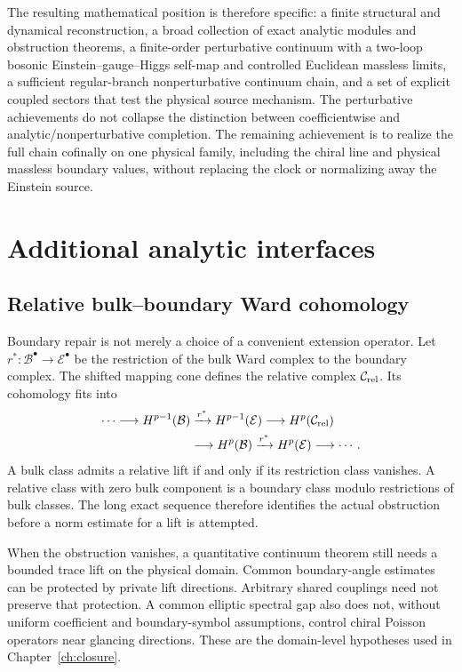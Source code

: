 \documentclass[11pt,a4paper,oneside]{book}
\theoremstyle{plain}
\theoremstyle{definition}
\theoremstyle{remark}
\newcommand{\src}[2]{\cite{#1}}
\begin{document}
The resulting mathematical position is therefore specific: a finite structural and dynamical reconstruction, a broad collection of exact analytic modules and obstruction theorems, a finite-order perturbative continuum with a two-loop bosonic Einstein--gauge--Higgs self-map and controlled Euclidean massless limits, a sufficient regular-branch nonperturbative continuum chain, and a set of explicit coupled sectors that test the physical source mechanism.  The perturbative achievements do not collapse the distinction between coefficientwise and analytic/nonperturbative completion.  The remaining achievement is to realize the full chain cofinally on one physical family, including the chiral line and physical massless boundary values, without replacing the clock or normalizing away the Einstein source.


\appendix
\chapter{Additional analytic interfaces}
\label{app:interfaces}
\section{Relative bulk--boundary Ward cohomology}
Boundary repair is not merely a choice of a convenient extension operator. Let $r^*:\mathcal B^\bullet\to\mathcal E^\bullet$ be the restriction of the bulk Ward complex to the boundary complex. The shifted mapping cone defines the relative complex $\mathcal C_{\rm rel}$. Its cohomology fits into
\begin{equation}
\begin{aligned}
 \cdots\longrightarrow H^{p-1}(\mathcal B)
 &\xrightarrow{r^*}H^{p-1}(\mathcal E)
 \longrightarrow H^p(\mathcal C_{\rm rel})\\
 &\longrightarrow H^p(\mathcal B)
 \xrightarrow{r^*}H^p(\mathcal E)\longrightarrow\cdots.
\end{aligned}
 \label{eq:relative-sequence}
\end{equation}
A bulk class admits a relative lift if and only if its restriction class vanishes. A relative class with zero bulk component is a boundary class modulo restrictions of bulk classes. The long exact sequence therefore identifies the actual obstruction before a norm estimate for a lift is attempted. \src{R2}{thm:v2v92-long-exact}

When the obstruction vanishes, a quantitative continuum theorem still needs a bounded trace lift on the physical domain. Common boundary-angle estimates can be protected by private lift directions. Arbitrary shared couplings need not preserve that protection. A common elliptic spectral gap also does not, without uniform coefficient and boundary-symbol assumptions, control chiral Poisson operators near glancing directions. These are the domain-level hypotheses used in Chapter~\ref{ch:closure}.
\end{document}
